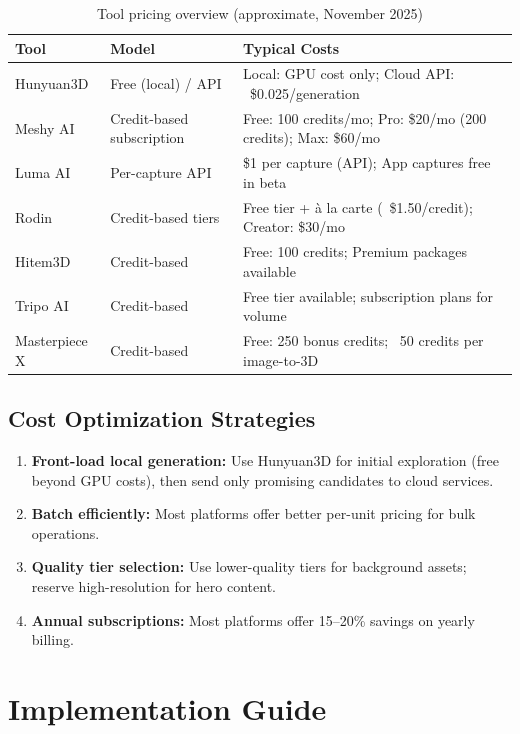 \documentclass[11pt]{article}
\begin{document}
\begin{table}[H]
\centering
\small
\renewcommand{\arraystretch}{1.2}
\begin{tabularx}{\textwidth}{@{}l l X@{}}
\toprule
\textbf{Tool} & \textbf{Model} & \textbf{Typical Costs} \\
\midrule
Hunyuan3D & Free (local) / API & Local: GPU cost only; Cloud API: ~\$0.025/generation \\
Meshy AI & Credit-based subscription & Free: 100 credits/mo; Pro: \$20/mo (200 credits); Max: \$60/mo \\
Luma AI & Per-capture API & \$1 per capture (API); App captures free in beta \\
Rodin & Credit-based tiers & Free tier + à la carte (~\$1.50/credit); Creator: \$30/mo \\
Hitem3D & Credit-based & Free: 100 credits; Premium packages available \\
Tripo AI & Credit-based & Free tier available; subscription plans for volume \\
Masterpiece X & Credit-based & Free: 250 bonus credits; ~50 credits per image-to-3D \\
\bottomrule
\end{tabularx}
\caption{Tool pricing overview (approximate, November 2025)}
\label{tab:pricing}
\end{table}

\subsection{Cost Optimization Strategies}

\begin{enumerate}[leftmargin=2em]
  \item \textbf{Front-load local generation:} Use Hunyuan3D for initial exploration (free beyond GPU costs), then send only promising candidates to cloud services.
  \item \textbf{Batch efficiently:} Most platforms offer better per-unit pricing for bulk operations.
  \item \textbf{Quality tier selection:} Use lower-quality tiers for background assets; reserve high-resolution for hero content.
  \item \textbf{Annual subscriptions:} Most platforms offer 15--20\% savings on yearly billing.
\end{enumerate}

\section{Implementation Guide}
\end{document}
